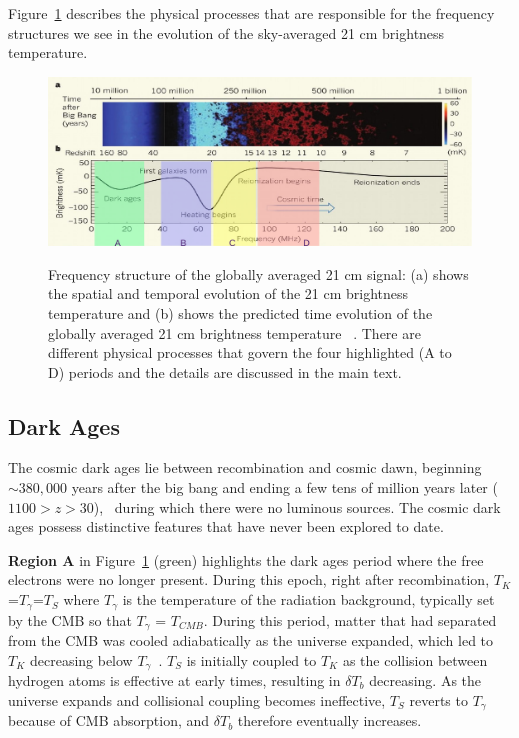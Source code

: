 Figure~\ref{Fig:epochs} describes the physical processes that are responsible for the frequency structures we see in the evolution of the sky-averaged 21 cm brightness temperature.

\begin{figure}
	\begin{center}
		\includegraphics[width=\linewidth]{Figures/epo.pdf}\\
		\caption{Frequency structure of the globally averaged 21 cm signal: (a) shows the spatial and temporal evolution of the 21 cm brightness temperature and (b) shows the predicted time evolution of the globally averaged 21 cm brightness temperature ~\citep{2012RPPh...75h6901P}. There are different physical processes that govern the four highlighted (A to D) periods and the details are discussed in the main text.}			
		\label{Fig:epochs}
	\end{center}
\end{figure}

\subsection{Dark Ages}

The cosmic dark ages lie between recombination and cosmic dawn, beginning $\sim380,000$ years after the big bang and ending a few tens of million years later ($1100 > z > 30$),~\citep{2014arXiv1412.2096J} during which there were no luminous sources. The cosmic dark ages possess distinctive features that have never been explored to date. 

\textbf{Region A} in Figure~\ref{Fig:epochs} (green) highlights the dark ages period where the free electrons were no longer present. During this epoch, right after recombination, $T_K$=$T_\gamma$=$T_S$ where $T_\gamma$ is the temperature of the radiation background, typically set by the CMB so that $T_\gamma$ = $T_{CMB}$. During this period, matter that had separated from the CMB was cooled adiabatically as the universe expanded, which led to $T_K$ decreasing below $T_\gamma$~\citep{2006PhR...433..181F}. $T_S$ is initially coupled to $T_K$ as the collision between hydrogen atoms is effective at early times, resulting in $\delta T_b$ decreasing. As the universe expands and collisional coupling becomes ineffective, $T_S$ reverts to $T_\gamma$ because of CMB absorption, and $\delta T_b$ therefore eventually increases.

